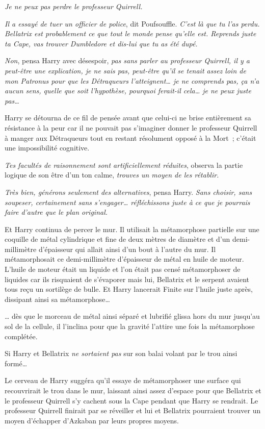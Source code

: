 \emph{Je ne peux pas perdre le professeur Quirrell.}

\emph{Il a essayé de tuer un officier de police}, dit Poufsouffle. \emph{C'est là que tu l'as perdu. Bellatrix est probablement ce que tout le monde pense qu'elle est. Reprends juste ta Cape, vas trouver Dumbledore et dis-lui que tu as été dupé.}

\emph{Non}, pensa Harry avec désespoir, \emph{pas sans parler au professeur Quirrell, il y a peut-être une explication, je ne sais pas, peut-être qu'il se tenait assez loin de mon Patronus pour que les Détraqueurs l'atteignent… je ne comprends pas, ça n'a aucun sens, quelle que soit l'hypothèse, pourquoi ferait-il cela… je ne peux juste pas…}

Harry se détourna de ce fil de pensée avant que celui-ci ne brise entièrement sa résistance à la peur car il ne pouvait pas s'imaginer donner le professeur Quirrell à manger aux Détraqueurs tout en restant résolument opposé à la Mort~; c'était une impossibilité cognitive.

\emph{Tes facultés de raisonnement sont artificiellement réduites}, observa la partie logique de son être d'un ton calme, \emph{trouves un moyen de les rétablir.}

\emph{Très bien, générons seulement des alternatives}, pensa Harry. \emph{Sans choisir, sans soupeser, certainement sans s'engager… réfléchissons juste à ce que je pourrais faire d'autre que le plan original.}

Et Harry continua de percer le mur. Il utilisait la métamorphose partielle sur une coquille de métal cylindrique et fine de deux mètres de diamètre et d'un demi-millimètre d'épaisseur qui allait ainsi d'un bout à l'autre du mur. Il métamorphosait ce demi-millimètre d'épaisseur de métal en huile de moteur. L'huile de moteur était un liquide et l'on était pas censé métamorphoser de liquides car ils risquaient de s'évaporer mais lui, Bellatrix et le serpent avaient tous reçu un sortilège de bulle. Et Harry lancerait Finite sur l'huile juste après, dissipant ainsi sa métamorphose…

… dès que le morceau de métal ainsi séparé et lubrifié glissa hors du mur jusqu'au sol de la cellule, il l'inclina pour que la gravité l'attire une fois la métamorphose complétée.

Si Harry et Bellatrix \emph{ne sortaient pas} sur son balai volant par le trou ainsi formé…

Le cerveau de Harry suggéra qu'il essaye de métamorphoser une surface qui recouvrirait le trou dans le mur, laissant ainsi assez d'espace pour que Bellatrix et le professeur Quirrell s'y cachent sous la Cape pendant que Harry se rendrait. Le professeur Quirrell finirait par se réveiller et lui et Bellatrix pourraient trouver un moyen d'échapper d'Azkaban par leurs propres moyens.

